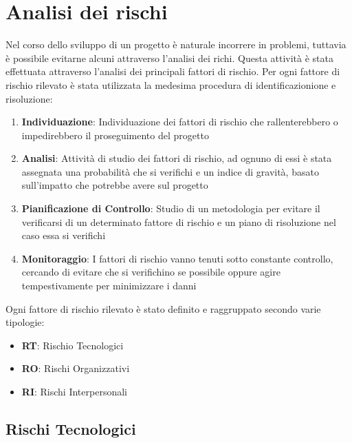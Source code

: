 \section{Analisi dei rischi}
	Nel corso dello sviluppo di un progetto è naturale incorrere in problemi, tuttavia è possibile evitarne alcuni attraverso l'analisi dei richi. Questa attività è stata effettuata attraverso l'analisi dei principali fattori di rischio. Per ogni fattore di rischio rilevato è stata utilizzata la medesima procedura di identificazionione e risoluzione:
	\begin{enumerate}
		\item \textbf{Individuazione}: Individuazione dei fattori di rischio che rallenterebbero o impedirebbero il proseguimento del progetto
		\item \textbf{Analisi}: Attività di studio dei fattori di rischio, ad ognuno di essi è stata assegnata una probabilità che si verifichi e un indice di gravità, basato sull'impatto che potrebbe avere sul progetto
		\item \textbf{Pianificazione di Controllo}: Studio di un metodologia per evitare il verificarsi di un determinato fattore di rischio e un piano di risoluzione nel caso essa si verifichi
		\item \textbf{Monitoraggio}: I fattori di rischio vanno tenuti sotto constante controllo, cercando di evitare che si verifichino se possibile oppure agire tempestivamente per minimizzare i danni
	\end{enumerate}
	Ogni fattore di rischio rilevato è stato definito e raggruppato secondo varie tipologie:
	\begin{itemize}
		\item \textbf{RT}: Rischio Tecnologici
		\item \textbf{RO}: Rischi Organizzativi
		\item \textbf{RI}: Rischi Interpersonali
	\end{itemize}
	\subsection{Rischi Tecnologici}
	\def\productquality{
    		{
        		Inesperienza
			Tecnologica
			RT1,
        		La maggior parte delle tecnologie richieste nello sviluppo del progetto sono nuove per molti componenti del team, 
        		Il responsabile dovrà rilevare conoscenze e lacune dei vari componenti del team provando ad indicare una via ottimale per risolvere la mancanza di conoscenze,
        		Occorrenza: Alta 
			Pericolosità: Alta,
        		I compiti più onerasi verranno assegnati a più persone favorendo l'assistenza reciproca
    		},
	}
	

